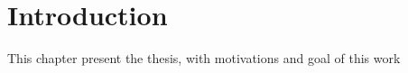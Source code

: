 \documentclass[pdftex,12pt,a4paper]{report}
\begin{document}


\newpage
\tableofcontents
\newpage

\chapter{Introduction}
This chapter present the thesis, with motivations and goal of this work
%
\end{document}
